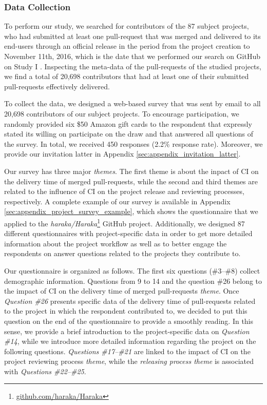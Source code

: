 	\subsubsection{Data Collection}
	\label{sec:data_collection}
	
	To perform our study, we searched for contributors of the 87 subject projects, who had submitted at least one pull-request that was merged and delivered to its end-users through an official release in the period from the project creation to November 11th, 2016, which is the date that we performed our search on GitHub on Study I \cite{bernardo2018studying}. Inspecting the meta-data of the pull-requests of the studied projects, we find a total of 20,698 contributors that had at least one of their submitted pull-requests effectively delivered. 
	
	To collect the data, we designed a web-based survey that was sent by email to all 20,698 contributors of our subject projects. To encourage participation, we randomly provided six \$50 Amazon gift cards to the respondent that expressly stated its willing on participate on the draw and that answered all questions of the survey. In total, we received 450 responses (2.2\% response rate). Moreover, we provide our invitation latter in Appendix \ref{sec:appendix_invitation_latter}.
	
	Our survey has three major \textit{themes}. The first theme is about the inpact of CI on the delivery time of merged pull-requests, while the second and third themes are related to the influence of CI on the project release and reviewing processes, respectively. A complete example of our survey is available in Appendix \ref{sec:appendix_project_survey_example}, which shows the questionnaire that we applied to the \textit{haraka/Haraka}\footnote{\url{github.com/haraka/Haraka}} GitHub project. Additionally, we designed 87 different questionnaires with project-specific data in order to get more detailed information about the project workflow as well as to better engage the respondents on answer questions related to the projects they contribute to.
	
	Our questionnaire is organized as follows. The first six questions (\#3--\#8) collect demographic information. Questions from 9 to 14 and the question  \#26 belong to the impact of CI on the delivery time of merged pull-requests \textit{theme}. Once \textit{Question \#26} presents specific data of the delivery time of pull-requests related to the project in which the respondent contributed to, we decided to put this question on the end of the questionnaire to provide a smoothly reading. In this sense, we provide a brief introduction to the project-specific data on \textit{Question \#14}, while we introduce more detailed information regarding the project on the following questions. \textit{Questions \#17--\#21} are linked to the impact of CI on the project reviewing process \textit{theme}, while the \textit{releasing process theme} is associated with \textit{Questions \#22--\#25}.
	
